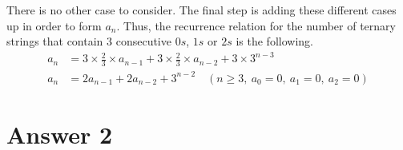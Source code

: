 \documentclass[12pt]{article}
\begin{document}
There is no other case to consider. The final step is adding these different cases up in order to form $a_n$. Thus, the recurrence relation for the number of ternary strings that contain 3 consecutive $0s$, $1s$ or $2s$ is the following.
\begin{equation*}
    \begin{split}
        a_n & = 3 \times \frac{2}{3} \times a_{n - 1} + 3 \times \frac{2}{3} \times a_{n - 2} + 3 \times 3^{n - 3} \\
        a_n & = 2a_{n - 1} + 2a_{n - 2} + 3^{n - 2} \quad (n \geq 3, \ a_0 = 0, \ a_1 = 0, \ a_2 = 0)
    \end{split}
\end{equation*}


\section*{Answer 2}
\end{document}

